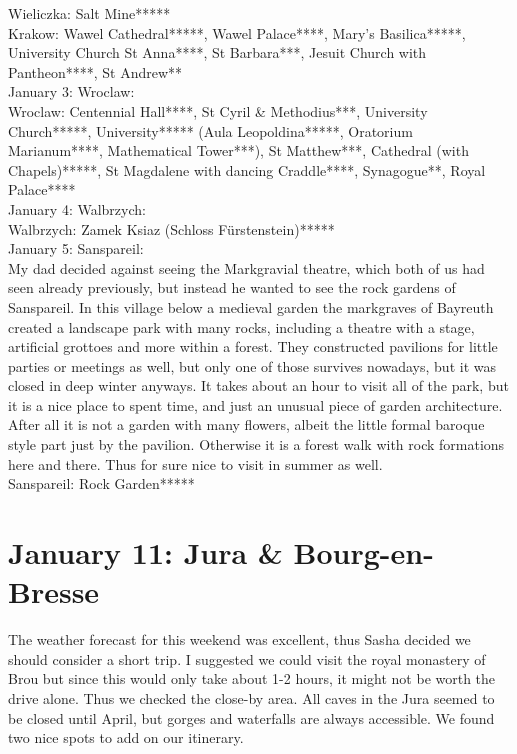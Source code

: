 Wieliczka: Salt Mine*****\\
Krakow: Wawel Cathedral*****, Wawel Palace****, Mary's Basilica*****, University Church St Anna****, St Barbara***, Jesuit Church with Pantheon****, St Andrew**\\

January 3: Wroclaw:\\

Wroclaw: Centennial Hall****, St Cyril \& Methodius***, University Church*****, University***** (Aula Leopoldina*****, Oratorium Marianum****, Mathematical Tower***), St Matthew***, Cathedral (with Chapels)*****, St Magdalene with dancing Craddle****, Synagogue**, Royal Palace****\\

January 4: Walbrzych:\\

Walbrzych: Zamek Ksiaz (Schloss F\"urstenstein)*****\\

January 5: Sanspareil:\\
My dad decided against seeing the Markgravial theatre, which both of us had seen already previously, but instead he wanted to see the rock gardens of Sanspareil. In this village below a medieval garden the markgraves of Bayreuth created a landscape park with many rocks, including a theatre with a stage, artificial grottoes and more within a forest. They constructed pavilions for little parties or meetings as well, but only one of those survives nowadays, but it was closed in deep winter anyways. It takes about an hour to visit all of the park, but it is a nice place to spent time, and just an unusual piece of garden architecture. After all it is not a garden with many flowers, albeit the little formal baroque style part just by the pavilion. Otherwise it is a forest walk with rock formations here and there. Thus for sure nice to visit in summer as well.\\

Sanspareil: Rock Garden*****\\

\section{January 11: Jura \& Bourg-en-Bresse}
\label{2020:BourgEnBresse}

The weather forecast for this weekend was excellent, thus Sasha decided we should consider a short trip. I suggested we could visit the royal monastery of Brou but since this would only take about 1-2 hours, it might not be worth the drive alone. Thus we checked the close-by area. All caves in the Jura seemed to be closed until April, but gorges and waterfalls are always accessible. We found two nice spots to add on our itinerary.\\

